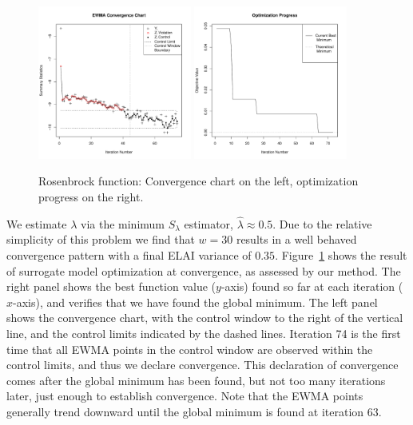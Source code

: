 \documentclass{article}
\begin{document}
%
\begin{figure}[htb]
  \includegraphics[width=0.45\textwidth]{./figures/ewmaConvChartRoseEasyEasyBW.pdf}
  \includegraphics[width=0.45\textwidth]{./figures/bestZRoseEasyEasyEnd.pdf}
  \caption{Rosenbrock function: Convergence chart on the left, optimization progress on the right.}
\label{fig:rosenbrock}
\end{figure}
We estimate $\lambda$ via the minimum $S_\lambda$ estimator, 
$\hat\lambda\approx 0.5$. Due to the relative simplicity of this problem 
we find that $w=30$ results in a well behaved convergence pattern with a final 
ELAI variance of $0.35$. Figure~\ref{fig:rosenbrock} shows the result of 
surrogate model optimization at convergence, as assessed by our method. The 
right panel shows the best function value ($y$-axis) found so far at each 
iteration ($x$-axis), and verifies that we have found the global minimum. The 
left panel shows the convergence chart, with the control window to the right 
of the vertical line, and the control limits indicated by the dashed 
lines. Iteration 74 is the first time that all EWMA points in the control 
window are observed within the control limits, and thus we declare 
convergence. This declaration of convergence comes after the global minimum 
has been found, but not too many iterations later, just enough to establish 
convergence. Note that the EWMA points generally trend downward until the 
global minimum is found at iteration 63.  
\end{document}
